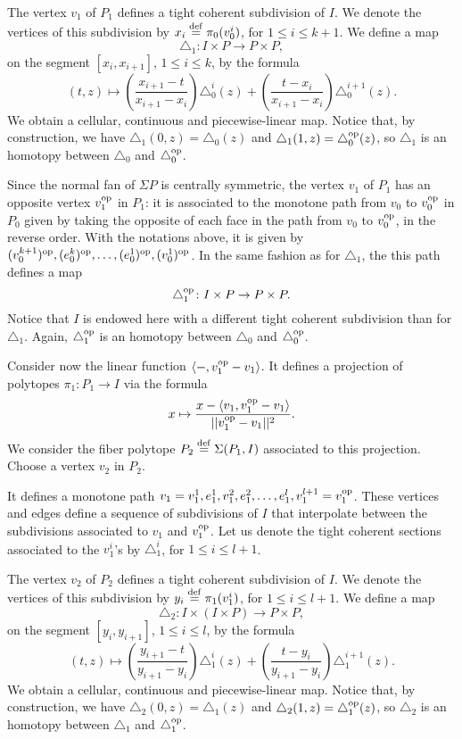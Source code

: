 The vertex $v_1$ of $P_1$ defines a tight coherent subdivision of $I$.
We denote the vertices of this subdivision by $x_i \stackrel{\mathrm{def}}{=} \pi_0(v_0^i)$, for $1 \leq i \leq k+1$.
We define a map
\[
\triangle_1 \colon I \times P \to P \times P,
\]
on the segment $[x_i, x_{i+1}]$, $1 \leq i \leq k$, by the formula
\[
(t,z) \mapsto \left( \frac{x_{i+1}-t}{x_{i+1}-x_i} \right) \triangle_0^{i}(z) + \left( \frac{t-x_{i}}{x_{i+1}-x_i} \right) \triangle_0^{i+1}(z).
\]
We obtain a cellular, continuous and piecewise-linear map.
Notice that, by construction, we have $\triangle_1(0,z)=\triangle_0(z)$ and $\triangle_1(1,z)=\triangle_0^{\mathrm{op}}(z)$, so $\triangle_1$ is an homotopy between $\triangle_0$ and $\triangle_0^{\mathrm{op}}$.

Since the normal fan of $\Sigma P$ is centrally symmetric, the vertex $v_1$ of $P_1$ has an opposite vertex $v_1^{\mathrm{op}}$ in $P_1$: it is associated to the monotone path from $v_0$ to $v_0^{\mathrm{op}}$ in $P_0$ given by taking the opposite of each face in the path from $v_0$ to $v^{\mathrm{op}}_0$, in the reverse order.
With the notations above, it is given by $(v_0^{k+1})^{\mathrm{op}},(e_0^k)^{\mathrm{op}},\ldots,(e_0^1)^{\mathrm{op}},(v_0^1)^{\mathrm{op}}$.
In the same fashion as for $\triangle_1$, the this path defines a map
\[
\triangle_1^{\mathrm{op}} \colon I \times P \to P \times P.
\]
Notice that $I$ is endowed here with a different tight coherent subdivision than for $\triangle_1$.
Again, $\triangle_1^{\mathrm{op}}$ is an homotopy between $\triangle_0$ and $\triangle_0^{\mathrm{op}}$.

Consider now the linear function $\langle - , v^{\mathrm{op}}_1-v_1 \rangle$.
It defines a projection of polytopes $\pi_1 \colon P_1 \to I$ via the formula
\[
x \mapsto \frac{x-\langle v_1, v^{\mathrm{op}}_1-v_1 \rangle}{||v^{\mathrm{op}}_1-v_1||^2}.
\]
We consider the fiber polytope $P_2 \stackrel{\mathrm{def}}{=} \Sigma(P_1,I)$ associated to this projection.
Choose a vertex $v_2$ in $P_2$.

It defines a monotone path $v_1 = v_1^1, e_1^1, v_1^2, e_1^2, \dots, e_1^l, v_1^{l+1} = v^{\mathrm{op}}_1$.
These vertices and edges define a sequence of subdivisions of $I$ that interpolate between the subdivisions associated to $v_1$ and $v_1^{\mathrm{op}}$.
Let us denote the tight coherent sections associated to the $v_1^i$'s by $\triangle_1^i$, for $1\leq i \leq l+1$.

The vertex $v_2$ of $P_2$ defines a tight coherent subdivision of $I$.
We denote the vertices of this subdivision by $y_i \stackrel{\mathrm{def}}{=} \pi_1(v_1^i)$, for $1 \leq i \leq l+1$.
We define a map
\[
\triangle_2 \colon I \times (I \times P) \to P \times P,
\]
on the segment $[y_i,y_{i+1}]$, $1 \leq i \leq l$, by the formula
\[
(t,z) \mapsto \left(\frac{y_{i+1}-t}{y_{i+1}-y_i}\right)\triangle_1^{i}(z)+\left(\frac{t-y_{i}}{y_{i+1}-y_i}\right)\triangle_1^{i+1}(z).
\]
We obtain a cellular, continuous and piecewise-linear map.
Notice that, by construction, we have $\triangle_2(0,z)=\triangle_1(z)$ and $\triangle_2(1,z)=\triangle_1^{\mathrm{op}}(z)$, so $\triangle_2$ is an homotopy between $\triangle_1$ and $\triangle_1^{\mathrm{op}}$.

